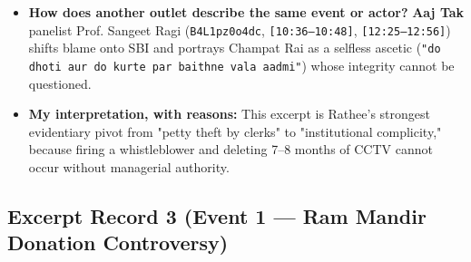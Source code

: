 \documentclass[10pt,a4paper]{article}
\begin{document}
\begin{itemize}[leftmargin=1.5em, itemsep=3pt, topsep=4pt]
  \item \textbf{How does another outlet describe the same event or actor?} \textbf{Aaj Tak} panelist Prof. Sangeet Ragi (\texttt{B4L1pz0o4dc}, \texttt{[10:36--10:48]}, \texttt{[12:25--12:56]}) shifts blame onto SBI and portrays Champat Rai as a selfless ascetic (\texttt{"do dhoti aur do kurte par baithne vala aadmi"}) whose integrity cannot be questioned.
  \item \textbf{My interpretation, with reasons:} This excerpt is Rathee's strongest evidentiary pivot from "petty theft by clerks" to "institutional complicity," because firing a whistleblower and deleting 7--8 months of CCTV cannot occur without managerial authority.
\end{itemize}

\subsection*{Excerpt Record 3 (Event 1 --- Ram Mandir Donation Controversy)}
\end{document}
